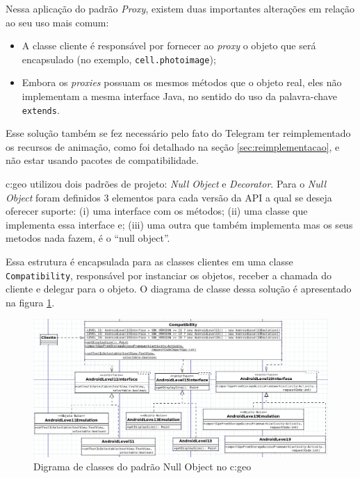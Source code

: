 Nessa aplicação do padrão \textit{Proxy}, existem duas importantes alterações em
relação ao seu uso mais comum:
\begin{itemize}
    \item A classe cliente é responsável por fornecer ao \textit{proxy} o objeto
        que será encapsulado (no exemplo, \texttt{cell.photoimage});
    \item Embora os \textit{proxies} possuam os mesmos métodos que o objeto real,
    eles não implementam a mesma interface Java, no sentido do uso da palavra-chave \texttt{extends}.
\end{itemize}

Esse solução também se fez necessário pelo fato do Telegram ter reimplementado os
recursos de animação, como foi detalhado na seção \ref{sec:reimplementacao},
e não estar usando pacotes de compatibilidade.

c:geo utilizou dois padrões de projeto: \textit{Null Object} e \textit{Decorator}.
Para o \textit{Null Object} foram definidos 3 elementos para cada versão da API
a qual se deseja oferecer suporte: (i) uma interface com os métodos; (ii) uma
classe que implementa essa interface e; (iii) uma outra que também implementa mas
os seus metodos nada fazem, é o “null object”.

Essa estrutura é encapsulada para as classes clientes em uma classe \texttt{Compatibility},
responsável por instanciar os objetos, receber a chamada do cliente e delegar para
o objeto. O diagrama de classe dessa solução é apresentado na figura \ref{fig:null_object}.

\begin{figure}[ht]
\centering
\includegraphics[scale=0.6, angle=90]{imagens/null_object.png}
\caption{Digrama de classes do padrão Null Object no c:geo}
\label{fig:null_object}
\end{figure}

